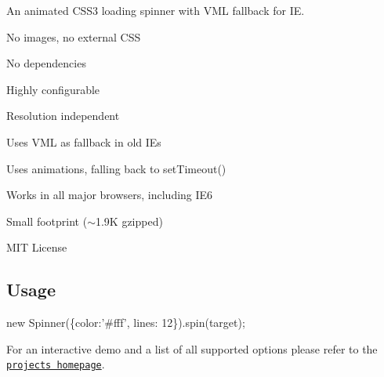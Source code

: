 An animated C\+S\+S3 loading spinner with V\+ML fallback for IE.


\begin{DoxyItemize}
\item No images, no external C\+SS
\item No dependencies
\item Highly configurable
\item Resolution independent
\item Uses V\+ML as fallback in old I\+Es
\item Uses  animations, falling back to set\+Timeout()
\item Works in all major browsers, including I\+E6
\item Small footprint ($\sim$1.9K gzipped)
\item M\+IT License
\end{DoxyItemize}

\subsection*{Usage}


\begin{DoxyCode}
new Spinner(\{color:'#fff', lines: 12\}).spin(target);
\end{DoxyCode}


For an interactive demo and a list of all supported options please refer to the \href{http://fgnass.github.io/spin.js/}{\tt project\textquotesingle{}s homepage}. 